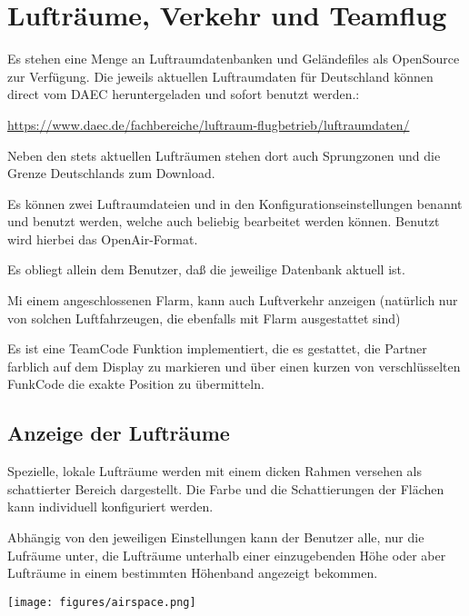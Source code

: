 \chapter{Lufträume, Verkehr und Teamflug}\label{cha:airspace}

Es stehen eine Menge an Luftraumdatenbanken und Geländefiles als   OpenSource zur Verfügung. Die
jeweils aktuellen Luftraumdaten für Deutschland können direct vom DAEC heruntergeladen und sofort
benutzt werden.: 
\begin{center}
  \url{https://www.daec.de/fachbereiche/luftraum-flugbetrieb/luftraumdaten/}
 \end{center}
 Neben den stets aktuellen Lufträumen stehen dort auch Sprungzonen und die Grenze Deutschlands zum Download. 
 
 Es können zwei Luftraumdateien  und in den Konfigurationseinstellungen benannt und benutzt werden, welche auch beliebig bearbeitet werden können. Benutzt wird hierbei das \textsf{OpenAir}-Format.



Es obliegt allein dem Benutzer, daß die jeweilige Datenbank aktuell ist.

Mi einem angeschlossenen Flarm, kann \xc  auch Luftverkehr anzeigen (natürlich nur von solchen
Luftfahrzeugen, die ebenfalls mit Flarm ausgestattet sind)

Es ist eine TeamCode Funktion implementiert, die es gestattet, die Partner farblich auf dem Display zu
markieren und über einen kurzen von \xc verschlüsselten FunkCode die exakte Position zu übermitteln.


\section{Anzeige der Lufträume}

Spezielle, lokale Lufträume werden mit einem dicken Rahmen versehen
als schattierter Bereich dargestellt. Die Farbe und die Schattierungen der
Flächen kann individuell konfiguriert werden.

Abhängig von den jeweiligen Einstellungen kann der Benutzer alle,
nur die Lufräume unter, die Lufträume unterhalb einer einzugebenden Höhe oder
aber Lufträume in einem bestimmten Höhenband angezeigt bekommen.


\begin{center}
\texttt{[image: figures/airspace.png]}
\end{center}

